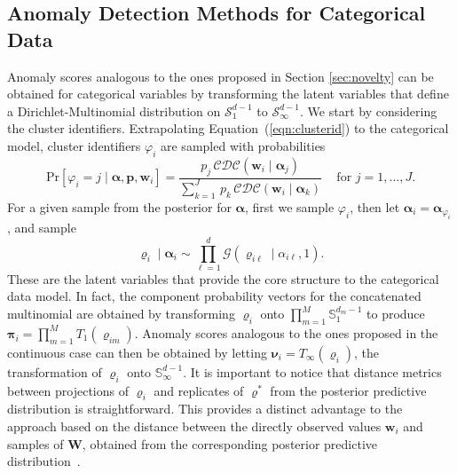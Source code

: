 \subsection{Anomaly Detection Methods for Categorical Data\label{subsec:catscores}}
Anomaly scores analogous to the ones proposed in Section \ref{sec:novelty} can be 
obtained for categorical variables by transforming the latent variables that define
a Dirichlet-Multinomial distribution on $\mathcal{S}_1^{d-1}$ to $\mathcal{S}_\infty^{d-1}$. 
We start by considering the cluster identifiers. Extrapolating Equation~(\ref{eqn:clusterid})
    to the categorical model, cluster identifiers $\varphi_i$ are sampled with probabilities
    \begin{equation}
        \label{eqn:latentposterior}
        \text{Pr}[\varphi_i = j\mid \bm{\alpha}, \bm{p}, \bm{w}_i] = 
        \frac{
            p_j\,\mathcal{CDC}\left(\bm{w}_i\mid\bm{\alpha}_j\right)
            }{
            \sum_{k = 1}^J\,p_k\,\mathcal{CDC}\left(\bm{w}_i\mid\bm{\alpha}_k\right)
            }
            \;\;\;\text{ for }j = 1, \ldots, J.
    \end{equation}
    For a given sample from the posterior for $\bm{\alpha}$,
    first we sample $\varphi_i$, then let $\bm{\alpha}_i = \bm{\alpha}_{\varphi_i}$, and
    sample
    \begin{equation}
        \label{eqn:postpredrho}
        \bm{\varrho}_i\mid\bm{\alpha}_i \sim 
        \prod_{\ell = 1}^d\mathcal{G}\left(\varrho_{i\ell}\mid\alpha_{i\ell}, 1\right).
    \end{equation}
    These are the latent variables that provide the core structure to the categorical
    data model. In fact, the component probability vectors for the concatenated multinomial
    are obtained by transforming $\bm{\varrho}_i$ onto $\prod_{m = 1}^M\mathbb{S}_1^{{d_m}-1}$
    to produce $\bm{\pi}_i = \prod_{m=1}^{M}T_1(\bm{\varrho}_{im})$. Anomaly scores
    analogous to the ones proposed in the continuous case can then be obtained by
    letting $\bm{\nu}_i = T_{\infty}(\bm{\varrho}_i)$, the transformation of $\bm{\varrho}_i$ 
    onto $\mathbb{S}_{\infty}^{d-1}$.
    It is important to notice that distance metrics 
    between projections of $\bm{\varrho}_i$ and  replicates of $\bm{\varrho}^*$ 
    from the posterior predictive distribution is straightforward. This provides
    a distinct advantage to the approach based on the distance between the 
    directly observed values $\bm{w}_i$ and samples of $\bm{W}$, obtained 
    from the corresponding posterior predictive distribution~\citep{Alamuri2014}. 
    
